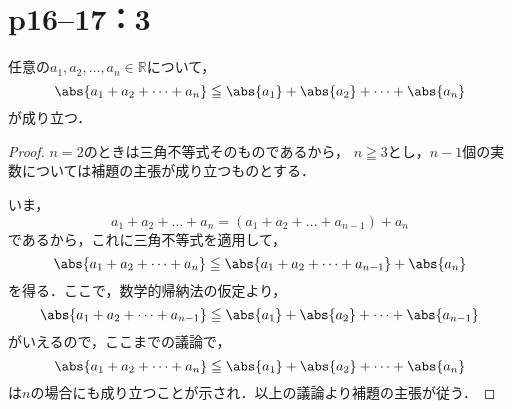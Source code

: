 \documentclass[a4paper,10pt,fleqn]{ltjsarticle}
\begin{document}
\section*{p16--17：3}


任意の$a_1 , a_2 , \dots, a_n \in \mathbb{R}$について，
\[
    \abs{a_1+a_2+\dots+a_n} \leqq \abs{a_1}+\abs{a_2}+\dots+\abs{a_n}
\]
が成り立つ．


\begin{proof}
    $n=2$のときは三角不等式そのものであるから，
    $n \geqq 3$とし，$n-1$個の実数については補題の主張が成り立つものとする．

    いま，
    \[
        a_1 + a_2 + \dots + a_n = (a_1+a_2+\dots+a_{n-1})+a_n
    \]
    であるから，これに三角不等式を適用して，
    \[
        \abs{a_1+a_2+\dots+a_n} \leqq \abs{a_1+a_2+\dots+a_{n-1}} +\abs{a_n}
    \]
    を得る．ここで，数学的帰納法の仮定より，
    \[
        \abs{a_1+a_2+\dots+a_{n-1}} \leqq \abs{a_1}+\abs{a_2}+\dots+\abs{a_{n-1}}
    \]
    がいえるので，ここまでの議論で，
    \[
        \abs{a_1+a_2+\dots+a_n} \leqq \abs{a_1}+\abs{a_2}+\dots+\abs{a_n}
    \]
    は$n$の場合にも成り立つことが示され．以上の議論より補題の主張が従う．
\end{proof}
\end{document}
